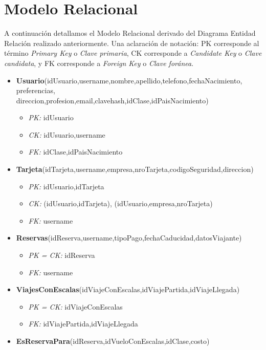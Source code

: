 \section{Modelo Relacional}

A continuaci\'on detallamos el Modelo Relacional derivado del
Diagrama Entidad Relaci\'on realizado anteriormente. Una aclaraci\'on
de notaci\'on: PK corresponde al t\'ermino \textit{Primary Key} o \textit{Clave primaria},
CK corresponde a \textit{Candidate Key} o \textit{Clave candidata}, y FK corresponde a
\textit{Foreign Key} o \textit{Clave for\'anea}.

\begin{itemize}
	\item \textbf{Usuario}(idUsuario,username,nombre,apellido,telefono,fechaNacimiento,
	preferencias,\\ direccion,profesion,email,clavehash,idClase,idPaisNacimiento)
		\begin{itemize}
			\item \textit{PK:} idUsuario
			\item \textit{CK:} idUsuario,username
			\item \textit{FK:} idClase,idPaisNacimiento
		\end{itemize}
	\item \textbf{Tarjeta}(idTarjeta,username,empresa,nroTarjeta,codigoSeguridad,direccion)
		\begin{itemize}
			\item \textit{PK:} idUsuario,idTarjeta
			\item \textit{CK:} (idUsuario,idTarjeta), (idUsuario,empresa,nroTarjeta)
			\item \textit{FK:} username
		\end{itemize}
	\item \textbf{Reservas}(idReserva,username,tipoPago,fechaCaducidad,datosViajante)
		\begin{itemize}
			\item \textit{PK = CK:} idReserva
			\item \textit{FK:} username
		\end{itemize}
	\item \textbf{ViajesConEscalas}(idViajeConEscalas,idViajePartida,idViajeLlegada)
		\begin{itemize}
			\item \textit{PK = CK:} idViajeConEscalas
			\item \textit{FK: } idViajePartida,idViajeLlegada
		\end{itemize}
	\item \textbf{EsReservaPara}(idReserva,idVueloConEscalas,idClase,costo)

\end{itemize}
